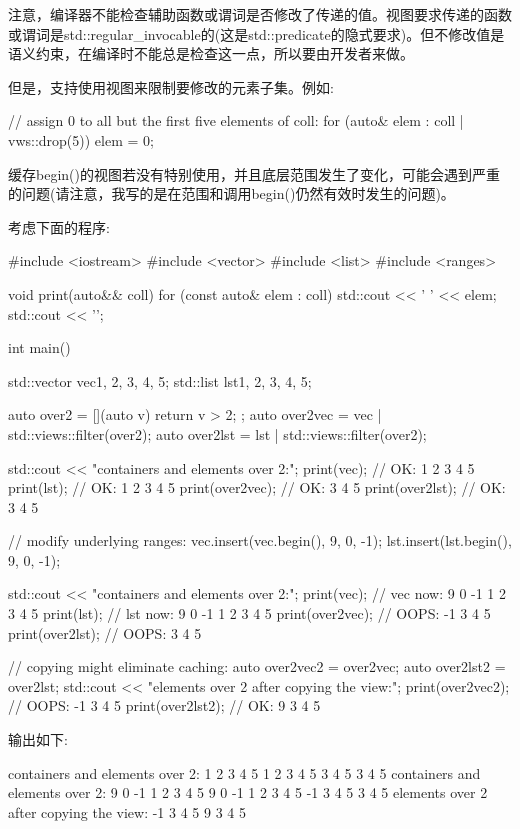 注意，编译器不能检查辅助函数或谓词是否修改了传递的值。视图要求传递的函数或谓词是std::regular\_invocable的(这是std::predicate的隐式要求)。但不修改值是语义约束，在编译时不能总是检查这一点，所以要由开发者来做。

但是，支持使用视图来限制要修改的元素子集。例如:

\begin{cpp}
// assign 0 to all but the first five elements of coll:
for (auto& elem : coll | vws::drop(5)) {
	elem = 0;
}
\end{cpp}


缓存begin()的视图若没有特别使用，并且底层范围发生了变化，可能会遇到严重的问题(请注意，我写的是在范围和调用begin()仍然有效时发生的问题)。

考虑下面的程序:


\begin{cpp}
#include <iostream>
#include <vector>
#include <list>
#include <ranges>

void print(auto&& coll)
{
	for (const auto& elem : coll) {
		std::cout << ' ' << elem;
	}
	std::cout << '\n';
}

int main()
{
	std::vector vec{1, 2, 3, 4, 5};
	std::list lst{1, 2, 3, 4, 5};
	
	auto over2 = [](auto v) { return v > 2; };
	auto over2vec = vec | std::views::filter(over2);
	auto over2lst = lst | std::views::filter(over2);
	
	std::cout << "containers and elements over 2:\n";
	print(vec); // OK: 1 2 3 4 5
	print(lst); // OK: 1 2 3 4 5
	print(over2vec); // OK: 3 4 5
	print(over2lst); // OK: 3 4 5
	
	// modify underlying ranges:
	vec.insert(vec.begin(), {9, 0, -1});
	lst.insert(lst.begin(), {9, 0, -1});
	
	std::cout << "containers and elements over 2:\n";
	print(vec); // vec now: 9 0 -1 1 2 3 4 5
	print(lst); // lst now: 9 0 -1 1 2 3 4 5
	print(over2vec); // OOPS: -1 3 4 5
	print(over2lst); // OOPS: 3 4 5
	
	// copying might eliminate caching:
	auto over2vec2 = over2vec;
	auto over2lst2 = over2lst;
	std::cout << "elements over 2 after copying the view:\n";
	print(over2vec2); // OOPS: -1 3 4 5
	print(over2lst2); // OK: 9 3 4 5
	}
\end{cpp}

输出如下:

\begin{shell}
containers and elements over 2:
1 2 3 4 5
1 2 3 4 5
3 4 5
3 4 5
containers and elements over 2:
9 0 -1 1 2 3 4 5
9 0 -1 1 2 3 4 5
-1 3 4 5
3 4 5
elements over 2 after copying the view:
-1 3 4 5
9 3 4 5
\end{shell}

